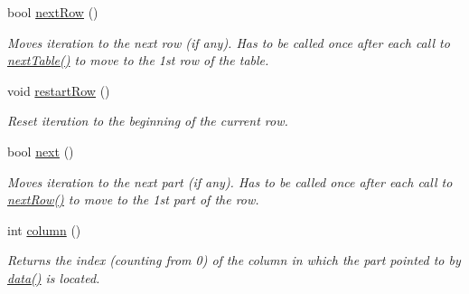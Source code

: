 \begin{DoxyCompactItemize}
bool \hyperlink{classoption_1_1PrintUsageImplementation_1_1LinePartIterator_a55d5c3e50f9c1d8cd48f518899a5a48c}{next\+Row} ()
\begin{DoxyCompactList}\small\item\em Moves iteration to the next row (if any). Has to be called once after each call to \hyperlink{classoption_1_1PrintUsageImplementation_1_1LinePartIterator_afe43ca12d399ed3c871e4dc5bf63356e}{next\+Table()} to move to the 1st row of the table. \end{DoxyCompactList}\item 
\mbox{\label{classoption_1_1PrintUsageImplementation_1_1LinePartIterator_a96c448939f33a811174ea7b5addb312e}} 
void \hyperlink{classoption_1_1PrintUsageImplementation_1_1LinePartIterator_a96c448939f33a811174ea7b5addb312e}{restart\+Row} ()
\begin{DoxyCompactList}\small\item\em Reset iteration to the beginning of the current row. \end{DoxyCompactList}\item 
bool \hyperlink{classoption_1_1PrintUsageImplementation_1_1LinePartIterator_a58b8743da57de2d108472eee60324df6}{next} ()
\begin{DoxyCompactList}\small\item\em Moves iteration to the next part (if any). Has to be called once after each call to \hyperlink{classoption_1_1PrintUsageImplementation_1_1LinePartIterator_a55d5c3e50f9c1d8cd48f518899a5a48c}{next\+Row()} to move to the 1st part of the row. \end{DoxyCompactList}\item 
\mbox{\label{classoption_1_1PrintUsageImplementation_1_1LinePartIterator_afa41382acabcd37ca70f7e8b9994b8c0}} 
int \hyperlink{classoption_1_1PrintUsageImplementation_1_1LinePartIterator_afa41382acabcd37ca70f7e8b9994b8c0}{column} ()
\begin{DoxyCompactList}\small\item\em Returns the index (counting from 0) of the column in which the part pointed to by \hyperlink{classoption_1_1PrintUsageImplementation_1_1LinePartIterator_ada26229add63bd479c7877f2f8e32908}{data()} is located. \end{DoxyCompactList}\item 
\mbox{\label{classoption_1_1PrintUsageImplementation_1_1LinePartIterator_a8ad1201d95bf0bd9453a731da8c15a10}} 

\end{DoxyCompactItemize}

